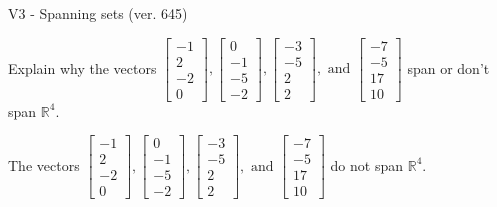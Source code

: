 \begin{exercise}
  \begin{exerciseTitle}V3 - Spanning sets (ver. 645)\end{exerciseTitle}
  \begin{exerciseStatement}
    Explain why the vectors \(\left[\begin{array}{r}
-1 \\
2 \\
-2 \\
0
\end{array}\right] , \left[\begin{array}{r}
0 \\
-1 \\
-5 \\
-2
\end{array}\right] , \left[\begin{array}{r}
-3 \\
-5 \\
2 \\
2
\end{array}\right] , \text{ and } \left[\begin{array}{r}
-7 \\
-5 \\
17 \\
10
\end{array}\right]\) span or don't span \(\mathbb{R}^4\). 
	


  \end{exerciseStatement}
  \begin{exerciseAnswer}
   The vectors \(\left[\begin{array}{r}
-1 \\
2 \\
-2 \\
0
\end{array}\right] , \left[\begin{array}{r}
0 \\
-1 \\
-5 \\
-2
\end{array}\right] , \left[\begin{array}{r}
-3 \\
-5 \\
2 \\
2
\end{array}\right] , \text{ and } \left[\begin{array}{r}
-7 \\
-5 \\
17 \\
10
\end{array}\right]\) 
  	 do not  
	span \(\mathbb{R}^4\).
  


  \end{exerciseAnswer}
\end{exercise}